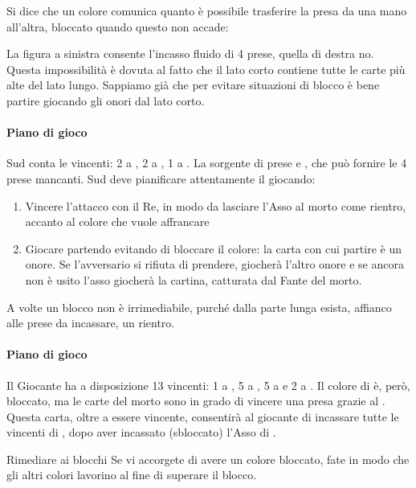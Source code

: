 \documentclass[../corsofiori.tex]{subfiles}
\begin{document}
Si dice che un colore comunica quanto è possibile trasferire la presa da una mano all'altra, bloccato quando questo non
accade:

\smallskip
\begin{center}
\qquad{}\hfill
\end{center}
\smallskip

La figura a sinistra consente l'incasso fluido di 4 prese, quella di destra no. Questa impossibilità è dovuta al fatto
che il lato corto contiene tutte le carte più alte del lato lungo. Sappiamo già che per evitare situazioni di blocco
è bene partire giocando gli onori dal lato corto.

\newgame
{}
\leftupper{\boardtext*}%
{\dealertext\quad}{\vulnertext}
\rightlower[2ex]{\lead: 2\He}{}{}

\showAll*

\paragraph{Piano di gioco} Sud conta le vincenti: 2 a \pic, 2 a \cu, 1 a \fio. La sorgente di prese e \qu, che può
fornire le 4 prese mancanti. Sud deve pianificare attentamente il giocando:
\begin{enumerate}
    \item Vincere l'attacco con il Re, in modo da lasciare l'Asso al morto come rientro, accanto al colore che vuole
        affrancare
    \item Giocare \qu partendo evitando di bloccare il colore: la carta con cui partire è un onore. Se l'avversario si
        rifiuta di prendere, giocherà l'altro onore e se ancora non è usito l'asso giocherà la cartina, catturata dal
        Fante del morto.
\end{enumerate}


A volte un blocco non è irrimediabile, purché dalla parte lunga esista, affianco alle prese da incassare, un rientro.


\newgame
{}
\leftupper{\boardtext*}%
{\dealertext\quad}{\vulnertext}

\showAll*


\paragraph{Piano di gioco} Il Giocante ha a disposizione 13 vincenti: 1 a \pic, 5 a \cu, 5 a \qu e 2 a \fio.
Il colore di \qu è, però, bloccato, ma le carte del morto sono in grado di vincere una presa grazie al \Ten\He.
Questa carta, oltre a essere vincente, consentirà al giocante di incassare tutte le vincenti di \qu, dopo aver incassato
(sbloccato) l'Asso di \qu.

\medskip
\begin{regola}{Rimediare ai blocchi}
    Se vi accorgete di avere un colore bloccato, fate in modo che gli altri colori lavorino al fine di superare il
    blocco.
\end{regola}
\end{document}
